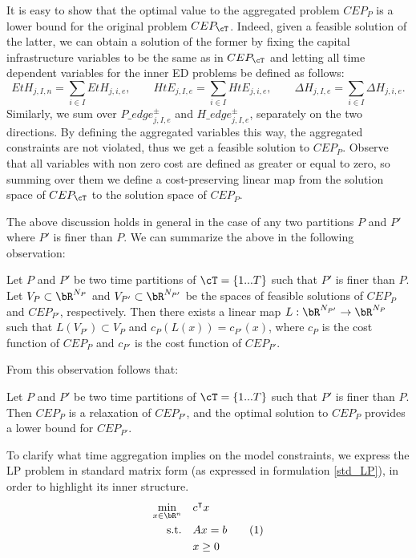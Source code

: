 It is easy to show that the optimal value to the aggregated problem \(CEP_P\) is a lower bound for the original problem \(CEP_{\cT}\). 
Indeed, given a feasible solution of the latter, we can obtain a solution of the former by fixing the capital infrastructure variables to be the same as in \(CEP_{\cT}\) and letting all time dependent variables for the inner ED problems be defined as follows:
\begin{equation}\label{sums var_t}
EtH_{j,I,n} = \sum_{i \in I} EtH_{j,i,e}, \quad\quad HtE_{j,I,e} = \sum_{i \in I} HtE_{j,i,e},  \quad\quad \Delta H_{j,I,e} = \sum_{i \in I} \Delta H_{j,i,e}.
\end{equation}
Similarly, we sum over \(P\_edge^\pm_{j,I,e}\) and \(H\_edge^\pm_{j,I,e}\), separately on the two directions.
By defining the aggregated variables this way, the aggregated constraints are not violated, thus we get a feasible solution to \(CEP_P\).
Observe that all variables with non zero cost are defined as greater or equal to zero, so summing over them we define a cost-preserving linear map from the solution space of \(CEP_{\cT}\) to the solution space of \(CEP_P\).

The above discussion holds in general in the case of any two partitions $P$ and $P'$ where $P'$ is finer than $P$.
We can summarize the above in the following observation:
\begin{observation}
Let $P$ and $P'$ be two time partitions of $\cT=\{1...T\}$ such that $P'$ is finer than $P$. Let \(V_{P} \subset \bR^{N_{P}}\) and \(V_{P'} \subset \bR^{N_{P'}}\) be the spaces of feasible solutions of \(CEP_{P}\) and \(CEP_{P'}\), respectively. Then there exists a linear map \(L: \bR^{N_{P'}} \to \bR^{N_{P}}\) such that \(L(V_{P'}) \subset V_{P}\) and \(c_{P}(L(x)) = c_{P'}(x)\), where \(c_{P}\) is the cost function of \(CEP_{P}\) and \(c_{P'}\) is the cost function of \(CEP_{P'}\).
\end{observation}

From this observation follows that:
\begin{proposition}
  Let $P$ and $P'$ be two time partitions of $\cT=\{1...T\}$ such that $P'$ is finer than $P$. Then $CEP_P$ is a relaxation of $CEP_{P'}$, and the optimal solution to $CEP_{P}$ provides a lower bound for $CEP_{P'}$.
\end{proposition}

To clarify what time aggregation implies on the model constraints, we express the LP problem in standard matrix form (as expressed in formulation \ref{std_LP}), in order to highlight its inner structure.
\begin{align*}
\min_{x \in \bR^{n}}\quad &c^\intercal x \\ 
\text{s.t.} \quad& Ax = b \stepcounter{equation}\tag{\theequation}\label{std_LP}\\
&x \geq 0
\end{align*}

